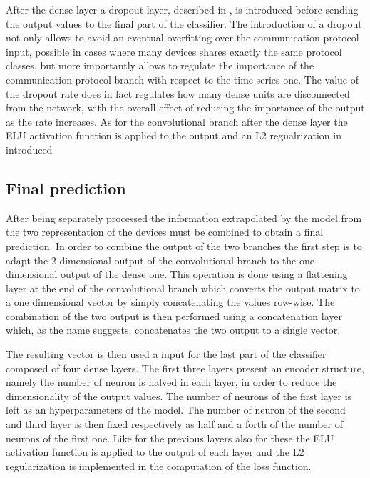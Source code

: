 After the dense layer a dropout layer, described in , is introduced before sending the output values to the final part of the classifier. The introduction of a dropout not only allows to avoid an eventual overfitting over the communication protocol input, possible in cases where many devices shares exactly the same protocol classes, but more importantly allows to regulate the importance of the communication protocol branch with respect to the time series one. The value of the dropout rate does in fact regulates how many dense units are disconnected from the network, with the overall effect of reducing the importance of the output as the rate increases.
As for the convolutional branch after the dense layer the ELU activation function is applied to the output and an L2 regualrization in introduced

\subsection{Final prediction}

After being separately processed the information extrapolated by the model from the two representation of the devices must be combined to obtain a final prediction. 
In order to combine the output of the two branches the first step is to adapt the 2-dimensional output of the convolutional branch to the one dimensional output of the dense one. This operation is done using a flattening layer at the end of the convolutional branch which converts the output matrix to a one dimensional vector by simply concatenating the values row-wise.
The combination of the two output is then performed using a concatenation layer which, as the name suggests, concatenates the two output to a single vector.

The resulting vector is then used a input for the last part of the classifier composed of four dense layers. The first three layers present an encoder structure, namely the number of neuron is halved in each layer, in order to reduce the dimensionality of the output values. The number of neurons of the first layer is left as an hyperparameters of the model. The number of neuron of the second and third layer is then fixed respectively as half and a forth of the number of neurons of the first one. Like for the previous layers also for these the ELU activation function is applied to the output of each layer and the L2 regularization is implemented in the computation of the loss function.

